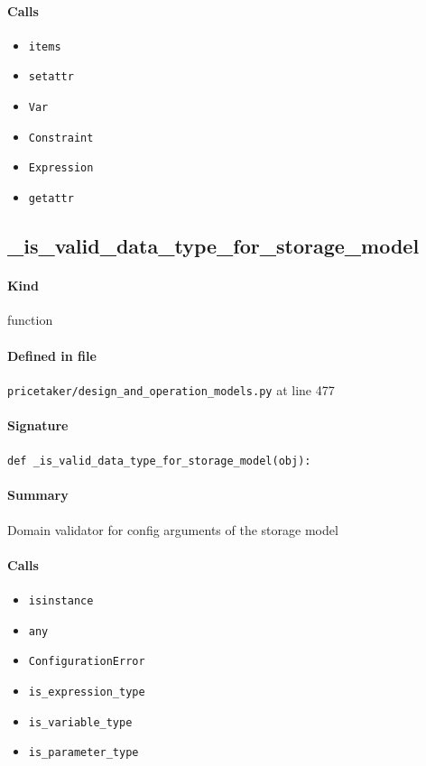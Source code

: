 \documentclass[11pt]{report}
\begin{document}
\paragraph{Calls}
\begin{itemize}[leftmargin=*]
  \item \texttt{items}
  \item \texttt{setattr}
  \item \texttt{Var}
  \item \texttt{Constraint}
  \item \texttt{Expression}
  \item \texttt{getattr}
\end{itemize}
\subsection{\_is\_valid\_data\_type\_for\_storage\_model}
\label{def:pricetaker-design_and_operation_models.py:_is_valid_data_type_for_storage_model:L477}
\paragraph{Kind} function
\paragraph{Defined in file} \texttt{pricetaker/design\_and\_operation\_models.py} at line 477
\paragraph{Signature} \texttt{def \_is\_valid\_data\_type\_for\_storage\_model(obj):}
\paragraph{Summary} Domain validator for config arguments of the storage model
\paragraph{Calls}
\begin{itemize}[leftmargin=*]
  \item \texttt{isinstance}
  \item \texttt{any}
  \item \texttt{ConfigurationError}
  \item \texttt{is\_expression\_type}
  \item \texttt{is\_variable\_type}
  \item \texttt{is\_parameter\_type}
\end{itemize}
\end{document}
